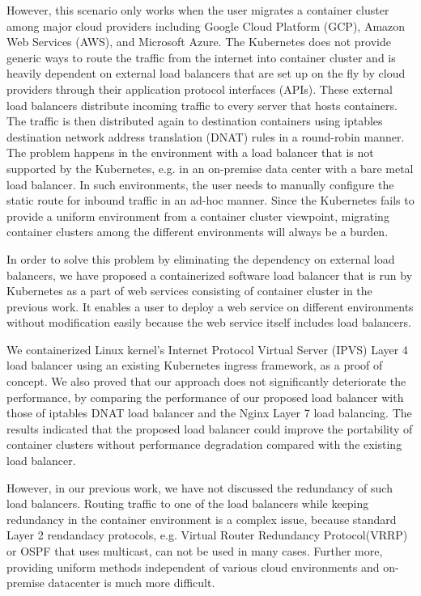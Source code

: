 However, this scenario only works when the user migrates a container cluster among major cloud providers including Google Cloud Platform (GCP), 
Amazon Web Services (AWS), and Microsoft Azure.
The Kubernetes does not provide generic ways to route the traffic from the internet into container cluster and is 
heavily dependent on external load balancers that are set up on the fly by cloud providers through their application protocol interfaces (APIs).
%
These external load balancers distribute incoming traffic to every server that hosts containers.
The traffic is then distributed again to destination containers using iptables destination 
network address translation (DNAT)\cite{MartinA.Brown2017,Marmol2015} rules in a round-robin manner. 
The problem happens in the environment with a load balancer that is not supported by the Kubernetes, 
e.g. in an on-premise data center with a bare metal load balancer. 
In such environments, the user needs to manually configure 
the static route for inbound traffic in an ad-hoc manner. 
Since the Kubernetes fails to provide a uniform environment from a container cluster viewpoint,
migrating container clusters among the different environments will always be a burden.

In order to solve this problem by eliminating the dependency on external load balancers,
we have proposed a containerized software load balancer that is run by Kubernetes as  
a part of web services consisting of container cluster in the previous work\cite{takahashi2018portable}.
It enables a user to deploy a web service on different environments without modification easily 
because the web service itself includes load balancers.

We containerized Linux kernel's Internet Protocol Virtual Server (IPVS)\cite{Zhang2000} 
Layer 4 load balancer using an existing Kubernetes ingress\cite{K8sIngress2017} framework, as a proof of concept.
%
%
We also proved that our approach does not significantly deteriorate the performance,  
by comparing the performance of our proposed load balancer with those of 
iptables DNAT load balancer and the Nginx Layer 7 load balancing. 
%
The results indicated that the proposed load balancer could improve the portability of container clusters 
without performance degradation compared with the existing load balancer.

However, in our previous work, we have not discussed the redundancy of such load balancers.
Routing traffic to one of the load balancers while keeping redundancy in the container environment is a complex issue,
because standard Layer 2 rendandacy protocols, e.g. Virtual Router Redundancy Protocol(VRRP) or OSPF\cite{moy1997ospf} that uses multicast, 
can not be used in many cases.
Further more, providing uniform methods independent of various cloud environments and on-premise datacenter is much more difficult.   

